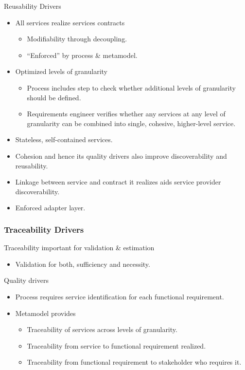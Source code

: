 
\begin{frame}{Reusability Drivers}
  \begin{itemize}
   \item<+-| alert@+> All services realize services contracts
      \begin{itemize}
		  \item Modifiability through decoupling.
		  \item ``Enforced'' by process \& metamodel.
      \end{itemize}
	 \item<+-| alert@+> Optimized levels of granularity
      \begin{itemize}
		  \item Process includes step to check whether additional levels of granularity should be defined.
		  \item Requirements engineer verifies whether any services at any level of granularity can be combined into single, cohesive, higher-level service.
      \end{itemize}
    \item<+-| alert@+> Stateless, self-contained services.
    \item<+-| alert@+> Cohesion and hence its quality drivers also improve discoverability and reusability.
    \item<+-| alert@+> Linkage between service and contract it realizes aids service provider discoverability.
	 \item<+-| alert@+> Enforced adapter layer.
  \end{itemize}
\end{frame}


\begin{frame}
  \frametitle{Traceability Drivers}
  Traceability important for validation \& estimation
  \begin{itemize}
   \item Validation for both, sufficiency and necessity.
  \end{itemize}
  \pause
  \begin{block}{Quality drivers}
    \begin{itemize}
      \item<+-| alert@+> Process requires service identification for each functional requirement.
      \item<+-| alert@+> Metamodel provides
	\begin{itemize}
	  \item Traceability of services across levels of granularity.
	  \item Traceability from service to functional requirement realized.
	  \item Traceability from functional requirement to stakeholder who requires it.
	\end{itemize}
    \end{itemize}
  \end{block}
\end{frame}


